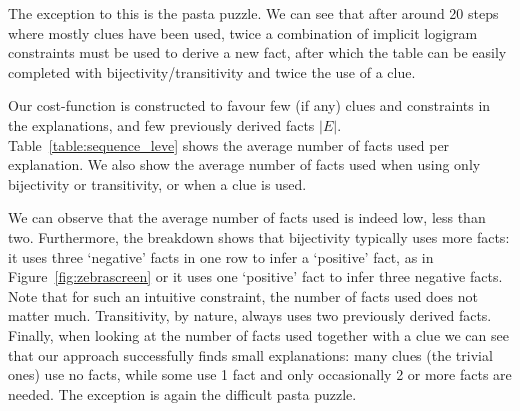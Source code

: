 The exception to this is the pasta puzzle. 
We can see that after around 20 steps where mostly clues have been used, twice a combination of implicit logigram constraints must be used to derive a new fact, after which the table can be easily completed with bijectivity/transitivity and twice the use of a clue.


Our cost-function is constructed to favour few (if any) clues and constraints in the explanations, and few previously derived facts $|E|$. 
Table~\ref{table:sequence_leve} shows the average number of facts used per explanation. We also show the average number of facts used when using only bijectivity or transitivity, or when a clue is used.

We can observe that the average number of facts used is indeed low, less than two. 
Furthermore, the breakdown shows that bijectivity typically uses more facts: it uses three `negative' facts in one row to infer a `positive' fact, as in Figure~\ref{fig:zebrascreen} or it uses one `positive' fact to infer three negative facts. 
Note that for such an intuitive constraint, the number of facts used does not matter much. 
Transitivity, by nature, always uses two previously derived facts. 
Finally, when looking at the number of facts used together with a clue we can see that our approach successfully finds small explanations: many clues (the trivial ones) use no facts, while some use 1 fact and only occasionally 2 or more facts are needed. 
The exception is again the difficult pasta puzzle.


